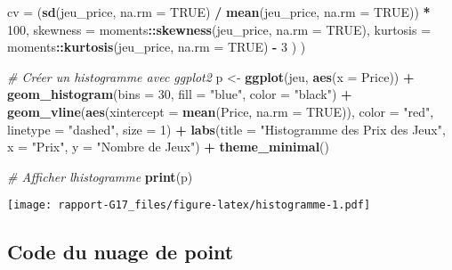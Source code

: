 \documentclass[mstat,12pt]{unswthesis}
\newenvironment{Shaded}{\begin{snugshade}}{\end{snugshade}}
\newcommand{\AttributeTok}[1]{\textcolor[rgb]{0.13,0.29,0.53}{#1}}
\newcommand{\CommentTok}[1]{\textcolor[rgb]{0.56,0.35,0.01}{\textit{#1}}}
\newcommand{\ConstantTok}[1]{\textcolor[rgb]{0.56,0.35,0.01}{#1}}
\newcommand{\DecValTok}[1]{\textcolor[rgb]{0.00,0.00,0.81}{#1}}
\newcommand{\FunctionTok}[1]{\textcolor[rgb]{0.13,0.29,0.53}{\textbf{#1}}}
\newcommand{\NormalTok}[1]{#1}
\newcommand{\OtherTok}[1]{\textcolor[rgb]{0.56,0.35,0.01}{#1}}
\newcommand{\SpecialCharTok}[1]{\textcolor[rgb]{0.81,0.36,0.00}{\textbf{#1}}}
\newcommand{\StringTok}[1]{\textcolor[rgb]{0.31,0.60,0.02}{#1}}
\begin{document}
\begin{Shaded}
\begin{Highlighting}[]
    \AttributeTok{cv =}\NormalTok{ (}\FunctionTok{sd}\NormalTok{(jeu\_price, }\AttributeTok{na.rm =} \ConstantTok{TRUE}\NormalTok{) }\SpecialCharTok{/} 
            \FunctionTok{mean}\NormalTok{(jeu\_price, }\AttributeTok{na.rm =} \ConstantTok{TRUE}\NormalTok{)) }\SpecialCharTok{*} \DecValTok{100}\NormalTok{,}
    \AttributeTok{skewness =}\NormalTok{ moments}\SpecialCharTok{::}\FunctionTok{skewness}\NormalTok{(jeu\_price, }\AttributeTok{na.rm =} \ConstantTok{TRUE}\NormalTok{),}
    \AttributeTok{kurtosis =}\NormalTok{ moments}\SpecialCharTok{::}\FunctionTok{kurtosis}\NormalTok{(jeu\_price, }\AttributeTok{na.rm =} \ConstantTok{TRUE}\NormalTok{) }\SpecialCharTok{{-}} \DecValTok{3}
\NormalTok{  )}
\NormalTok{)}

\CommentTok{\# Créer un histogramme avec ggplot2}
\NormalTok{p }\OtherTok{\textless{}{-}} \FunctionTok{ggplot}\NormalTok{(jeu, }\FunctionTok{aes}\NormalTok{(}\AttributeTok{x =}\NormalTok{ Price)) }\SpecialCharTok{+}
  \FunctionTok{geom\_histogram}\NormalTok{(}\AttributeTok{bins =} \DecValTok{30}\NormalTok{, }\AttributeTok{fill =} \StringTok{"blue"}\NormalTok{, }\AttributeTok{color =} \StringTok{"black"}\NormalTok{) }\SpecialCharTok{+}
  \FunctionTok{geom\_vline}\NormalTok{(}\FunctionTok{aes}\NormalTok{(}\AttributeTok{xintercept =} \FunctionTok{mean}\NormalTok{(Price, }\AttributeTok{na.rm =} \ConstantTok{TRUE}\NormalTok{)), }\AttributeTok{color =} \StringTok{"red"}\NormalTok{, }
             \AttributeTok{linetype =} \StringTok{"dashed"}\NormalTok{, }\AttributeTok{size =} \DecValTok{1}\NormalTok{) }\SpecialCharTok{+}
  \FunctionTok{labs}\NormalTok{(}\AttributeTok{title =} \StringTok{"Histogramme des Prix des Jeux"}\NormalTok{, }\AttributeTok{x =} \StringTok{"Prix"}\NormalTok{, }\AttributeTok{y =} 
         \StringTok{"Nombre de Jeux"}\NormalTok{) }\SpecialCharTok{+}
  \FunctionTok{theme\_minimal}\NormalTok{()}

\CommentTok{\# Afficher l\textquotesingle{}histogramme}
\FunctionTok{print}\NormalTok{(p)}
\end{Highlighting}
\end{Shaded}

\texttt{[image: rapport-G17\_files/figure-latex/histogramme-1.pdf]}

\hypertarget{code-du-nuage-de-point}{%
\subsection*{Code du nuage de point}\label{code-du-nuage-de-point}}
\end{document}
